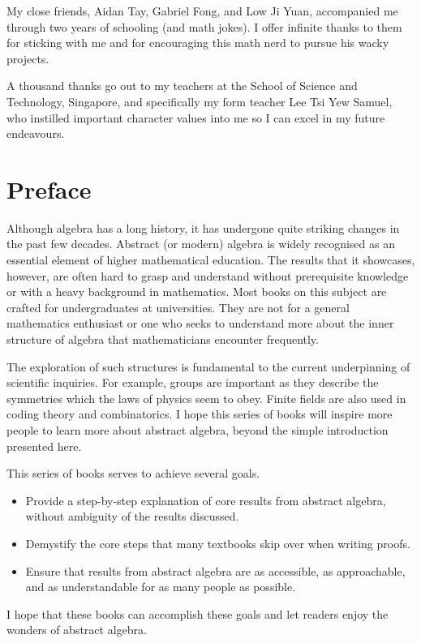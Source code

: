 My close friends, Aidan Tay, Gabriel Fong, and Low Ji Yuan, accompanied me through two years of schooling (and math jokes). I offer infinite thanks to them for sticking with me and for encouraging this math nerd to pursue his wacky projects.

A thousand thanks go out to my teachers at the School of Science and Technology, Singapore, and specifically my form teacher Lee Tsi Yew Samuel, who instilled important character values into me so I can excel in my future endeavours.

\chapter{Preface}
Although algebra has a long history, it has undergone quite striking changes in the past few decades. Abstract (or modern) algebra is widely recognised as an essential element of higher mathematical education. The results that it showcases, however, are often hard to grasp and understand without prerequisite knowledge or with a heavy background in mathematics. Most books on this subject are crafted for undergraduates at universities. They are not for a general mathematics enthusiast or one who seeks to understand more about the inner structure of algebra that mathematicians encounter frequently.

The exploration of such structures is fundamental to the current underpinning of scientific inquiries. For example, groups are important as they describe the symmetries which the laws of physics seem to obey. Finite fields are also used in coding theory and combinatorics. I hope this series of books will inspire more people to learn more about abstract algebra, beyond the simple introduction presented here.

This series of books serves to achieve several goals.
\begin{itemize}
    \item Provide a step-by-step explanation of core results from abstract algebra, without ambiguity of the results discussed.
    \item Demystify the core steps that many textbooks skip over when writing proofs.
    \item Ensure that results from abstract algebra are as accessible, as approachable, and as understandable for as many people as possible.
\end{itemize}
I hope that these books can accomplish these goals and let readers enjoy the wonders of abstract algebra.

